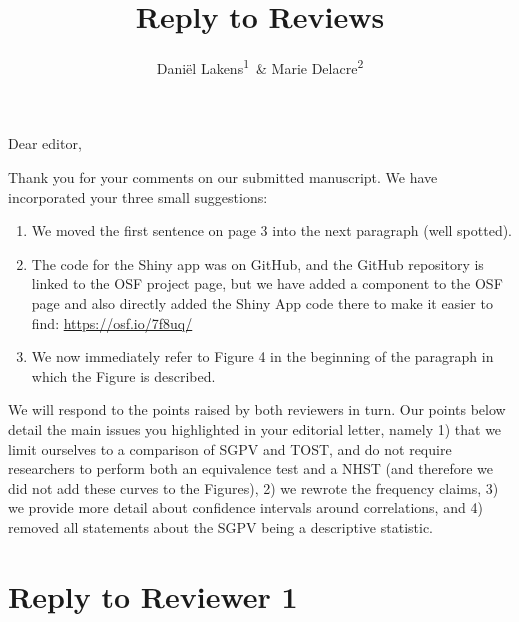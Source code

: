 \documentclass[man]{apa6}
\title{Reply to Reviews}
\author{Daniël Lakens\textsuperscript{1}~\& Marie Delacre\textsuperscript{2}}
\date{}
\affiliation{
\vspace{0.5cm}
\textsuperscript{1} Eindhoven University of Technology, Eindhoven, The Netherlands\\\textsuperscript{2} Service of Analysis of the Data, Université Libre de Bruxelles, Belgium}
\providecommand{\tightlist}{%
  \setlength{\itemsep}{0pt}\setlength{\parskip}{0pt}}
\begin{document}
\maketitle

Dear editor,

Thank you for your comments on our submitted manuscript. We have
incorporated your three small suggestions:

\begin{enumerate}
\def\labelenumi{\arabic{enumi}.}
\tightlist
\item
  We moved the first sentence on page 3 into the next paragraph (well
  spotted).
\item
  The code for the Shiny app was on GitHub, and the GitHub repository is
  linked to the OSF project page, but we have added a component to the
  OSF page and also directly added the Shiny App code there to make it
  easier to find: \url{https://osf.io/7f8uq/}
\item
  We now immediately refer to Figure 4 in the beginning of the paragraph
  in which the Figure is described.
\end{enumerate}

We will respond to the points raised by both reviewers in turn. Our
points below detail the main issues you highlighted in your editorial
letter, namely 1) that we limit ourselves to a comparison of SGPV and
TOST, and do not require researchers to perform both an equivalence test
and a NHST (and therefore we did not add these curves to the Figures),
2) we rewrote the frequency claims, 3) we provide more detail about
confidence intervals around correlations, and 4) removed all statements
about the SGPV being a descriptive statistic.

\section{Reply to Reviewer 1}\label{reply-to-reviewer-1}
\end{document}
